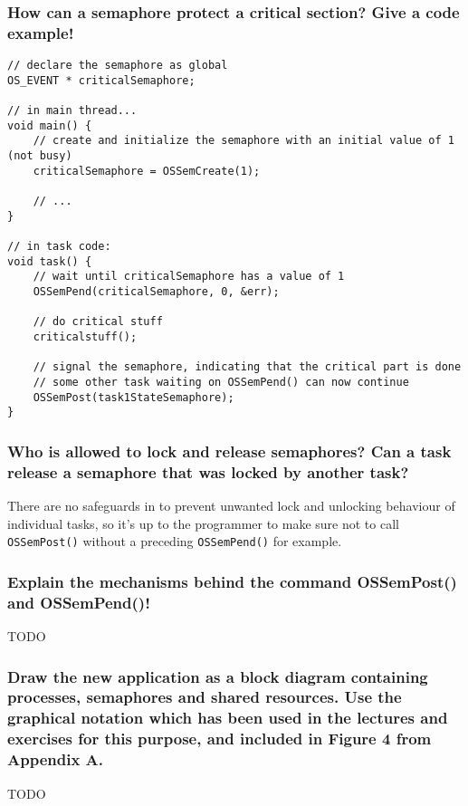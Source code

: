 \subsubsection*{How can a semaphore protect a critical section? Give a code example!}
\begin{minipage}{\linewidth}
\begin{lstlisting}[style=CStyle]
// declare the semaphore as global
OS_EVENT * criticalSemaphore;

// in main thread...
void main() {
    // create and initialize the semaphore with an initial value of 1 (not busy)
    criticalSemaphore = OSSemCreate(1); 

    // ...
}

// in task code:
void task() {
    // wait until criticalSemaphore has a value of 1
    OSSemPend(criticalSemaphore, 0, &err);

    // do critical stuff
    criticalstuff();
    
    // signal the semaphore, indicating that the critical part is done
    // some other task waiting on OSSemPend() can now continue
    OSSemPost(task1StateSemaphore);
}

\end{lstlisting}
\end{minipage}

\subsubsection*{Who is allowed to lock and release semaphores? Can a task release a semaphore that was locked by another task?}
There are no safeguards in \ucosii to prevent unwanted lock and unlocking behaviour of individual tasks, so it's up to the programmer to make sure not to call \texttt{OSSemPost()} without a preceding \texttt{OSSemPend()} for example.

\subsubsection*{Explain the mechanisms behind the command OSSemPost() and OSSemPend()!}
TODO
\subsubsection*{Draw the new application as a block diagram containing processes, semaphores and shared resources. Use the graphical notation which has been used in the lectures and exercises for this purpose, and included in Figure 4 from Appendix A.}
TODO

